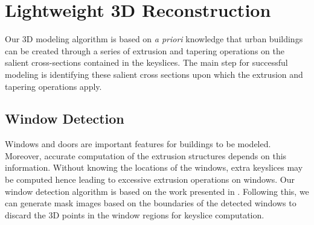 \documentclass[10pt, conference, compsocconf]{IEEEtran}
\begin{document}
%
%
%

\section{Lightweight 3D Reconstruction}
\label{sec:reconst}
Our 3D modeling algorithm is based on \emph{a priori} knowledge that
urban buildings can be created through a series of extrusion and tapering
operations on the salient cross-sections contained in the keyslices.
The main step for successful modeling is identifying these salient cross
sections upon which the extrusion and tapering operations apply.

\subsection{Window Detection}
\label{sec:win_detect}
Windows and doors are important features for buildings to be modeled.
Moreover, accurate computation of the extrusion structures depends on this information.
Without knowing the locations of the windows, extra keyslices may be computed
hence leading to excessive extrusion operations on windows.
Our window detection algorithm is based on the work presented in \cite{WDD_PV}.
Following this, we can generate mask images based on the boundaries of the
detected windows to discard the 3D points in the window regions for keyslice
computation.
\end{document}
